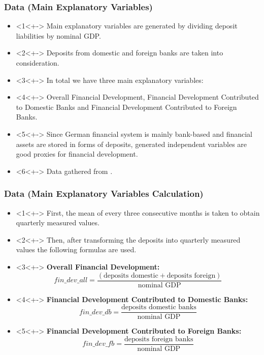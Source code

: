 \documentclass[11pt]{beamer}
\begin{document}
\begin{frame}
\frametitle{Data (Main Explanatory Variables)}
\begin{itemize}
\item<1<+-> Main explanatory variables are generated by dividing deposit liabilities by nominal GDP.
\item<2<+-> Deposits from domestic and foreign banks are taken into consideration.
\item<3<+-> In total we have three main explanatory variables:
\item<4<+-> Overall Financial Development, Financial Development Contributed to Domestic Banks and Financial Development Contributed to Foreign Banks.
\item<5<+-> Since German financial system is mainly bank-based and financial assets are stored in forms of deposits, generated independent variables are good proxies for financial development.
\item<6<+-> Data gathered from \cite{DeutscheBundesbank}.
\end{itemize}
\end{frame}

\begin{frame}
\frametitle{Data (Main Explanatory Variables Calculation)}
\begin{itemize}
\item<1<+-> First, the mean of every three consecutive months is taken to obtain quarterly measured values.
\item<2<+-> Then, after transforming the deposits into quarterly measured values the following formulas are used.
\item<3<+-> \textbf{Overall Financial Development:}
\begin{equation}
fin\_dev\_all = \frac {(\text{deposits domestic} + \text{deposits foreign})} {\text{nominal GDP}}
\end{equation}
\item<4<+-> \textbf{Financial Development Contributed to Domestic Banks:}
\begin{equation}
fin\_dev\_db = \frac {\text{deposits domestic banks}}
{\text{nominal GDP}}
\end{equation}
\item<5<+-> \textbf{Financial Development Contributed to Foreign Banks:}
\begin{equation}
 fin\_dev\_fb = \frac {\text{deposits foreign banks}}
 {\text{nominal GDP}}
\end{equation}
\end{itemize}
\end{frame}
\end{document}
